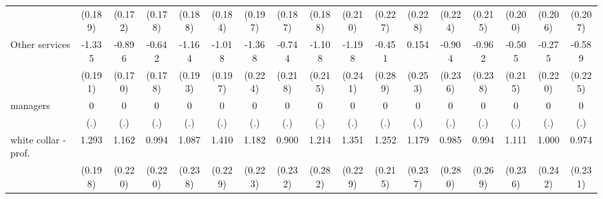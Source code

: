 {\begin{tabular}{l*{16}{c}}
                    &     (0.189)         &     (0.172)         &     (0.178)         &     (0.188)         &     (0.184)         &     (0.197)         &     (0.187)         &     (0.188)         &     (0.210)         &     (0.227)         &     (0.228)         &     (0.224)         &     (0.215)         &     (0.200)         &     (0.206)         &     (0.207)         \\
[1em]
Other services      &      -1.335\sym{***}&      -0.896\sym{***}&      -0.642\sym{***}&      -1.164\sym{***}&      -1.018\sym{***}&      -1.368\sym{***}&      -0.744\sym{***}&      -1.108\sym{***}&      -1.198\sym{***}&      -0.451         &       0.154         &      -0.904\sym{***}&      -0.962\sym{***}&      -0.505\sym{*}  &      -0.275         &      -0.589\sym{**} \\
                    &     (0.191)         &     (0.170)         &     (0.178)         &     (0.193)         &     (0.197)         &     (0.224)         &     (0.218)         &     (0.215)         &     (0.241)         &     (0.289)         &     (0.253)         &     (0.236)         &     (0.238)         &     (0.215)         &     (0.220)         &     (0.225)         \\
[1em]
managers            &           0         &           0         &           0         &           0         &           0         &           0         &           0         &           0         &           0         &           0         &           0         &           0         &           0         &           0         &           0         &           0         \\
                    &         (.)         &         (.)         &         (.)         &         (.)         &         (.)         &         (.)         &         (.)         &         (.)         &         (.)         &         (.)         &         (.)         &         (.)         &         (.)         &         (.)         &         (.)         &         (.)         \\
[1em]
white collar - prof.&       1.293\sym{***}&       1.162\sym{***}&       0.994\sym{***}&       1.087\sym{***}&       1.410\sym{***}&       1.182\sym{***}&       0.900\sym{***}&       1.214\sym{***}&       1.351\sym{***}&       1.252\sym{***}&       1.179\sym{***}&       0.985\sym{***}&       0.994\sym{***}&       1.111\sym{***}&       1.000\sym{***}&       0.974\sym{***}\\
                    &     (0.198)         &     (0.220)         &     (0.220)         &     (0.238)         &     (0.229)         &     (0.223)         &     (0.232)         &     (0.282)         &     (0.229)         &     (0.215)         &     (0.237)         &     (0.280)         &     (0.269)         &     (0.236)         &     (0.242)         &     (0.231)         \\

\end{tabular}}
